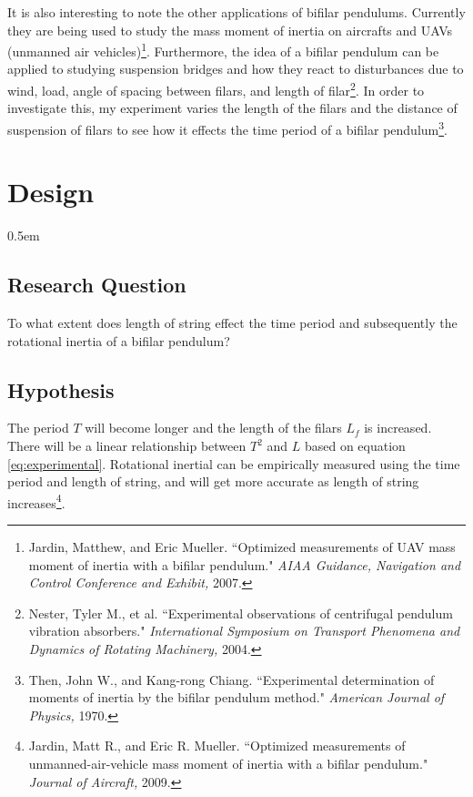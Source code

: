 \documentclass[a4paper,12pt]{article}
\theoremstyle{definition}
\begin{document}
It is also interesting to note the other applications of bifilar pendulums. Currently they are being used to study the mass moment of inertia on aircrafts and UAVs (unmanned air vehicles)\footnote{Jardin, Matthew, and Eric Mueller. ``Optimized measurements of UAV mass moment of inertia with a bifilar pendulum." \textit{AIAA Guidance, Navigation and Control Conference and Exhibit,} 2007.}. Furthermore, the idea of a bifilar pendulum can be applied to studying suspension bridges and how they react to disturbances due to wind, load, angle of spacing between filars, and length of filar\footnote{Nester, Tyler M., et al. ``Experimental observations of centrifugal pendulum vibration absorbers." \textit{International Symposium on Transport Phenomena and Dynamics of Rotating Machinery,} 2004.}. In order to investigate this, my experiment varies the length of the filars and the distance of suspension of filars to see how it effects the time period of a bifilar pendulum\footnote{Then, John W., and Kang-rong Chiang. ``Experimental determination of moments of inertia by the bifilar pendulum method." \textit{American Journal of Physics,} 1970.}.

\newpage
\section{Design}
\parskip0.5em

	\subsection{Research Question}

	To what extent does length of string effect the time period and subsequently the rotational inertia of a bifilar pendulum?
	
	\subsection{Hypothesis}
	
	
	The period $T$ will become longer and the length of the filars $L_f$ is increased. There will be a linear relationship between $T^2$ and $L$ based on equation \ref{eq:experimental}. Rotational inertial can be empirically measured using the time period and length of string, and will get more accurate as length of string increases\footnote{Jardin, Matt R., and Eric R. Mueller. ``Optimized measurements of unmanned-air-vehicle mass moment of inertia with a bifilar pendulum." \textit{Journal of Aircraft,} 2009.}.
\end{document}
